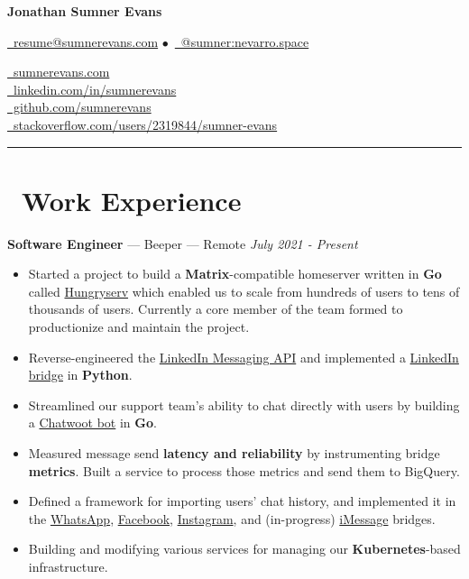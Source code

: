 \documentclass[10pt,letterpaper]{article}
\begin{document}
\begin{minipage}[b][][b]{0.5\linewidth}
    {\huge\textbf{Jonathan Sumner Evans}}

    \vspace{5pt}
    \href{mailto:resume@sumnerevans.com}{\faEnvelope\ resume@sumnerevans.com}
    $\bullet$\ \href{https://matrix.to/#/@sumner:nevarro.space}{\faMatrixOrg\ @sumner:nevarro.space}
\end{minipage}\hfill
\begin{minipage}[b][][b]{0.4375\linewidth}
    \href{https://sumnerevans.com}{\faGlobe\ sumnerevans.com} \\
    \href{https://www.linkedin.com/in/sumnerevans}{\faLinkedin\ linkedin.com/in/sumnerevans} \\
    \href{https://github.com/sumnerevans}{\faGithub\ github.com/sumnerevans} \\
    \href{https://stackoverflow.com/users/2319844/sumner-evans}{\faStackOverflow\ stackoverflow.com/users/2319844/sumner-evans}
\end{minipage}
\rule{\textwidth}{0.5pt}

\section*{\faBriefcase\ Work Experience}
{\fontsize{11}{0}
\textbf{Software Engineer} --- Beeper --- Remote}
\hfill \textit{July 2021 - Present}
\begin{itemize}
    \item Started a project to build a \textbf{Matrix}-compatible homeserver
        written in \textbf{Go} called
        \href{https://github.com/sumnerevans/hungryserv-presentation}{Hungryserv}
        which enabled us to scale from hundreds of users to tens of thousands of
        users. Currently a core member of the team formed to productionize and
        maintain the project.
    \item Reverse-engineered the
        \href{https://github.com/beeper/linkedin-messaging-api}{LinkedIn Messaging API}
        and implemented a
        \href{https://github.com/beeper/linkedin}{LinkedIn bridge} in
        \textbf{Python}.
    \item Streamlined our support team's ability to chat directly with users by
        building a
        \href{https://github.com/beeper/chatwoot}{Chatwoot bot} in
        \textbf{Go}.
    \item Measured message send \textbf{latency and reliability} by
        instrumenting bridge \textbf{metrics}. Built a service to process those
        metrics and send them to BigQuery.
    \item Defined a framework for importing users' chat history, and
        implemented it in the
        \href{https://github.com/mautrix/whatsapp}{WhatsApp},
        \href{https://github.com/mautrix/facebook}{Facebook},
        \href{https://github.com/mautrix/instagram}{Instagram}, and
        (in-progress) \href{https://github.com/mautrix/imessage}{iMessage} bridges.
    \item Building and modifying various services for managing our
        \textbf{Kubernetes}-based infrastructure.
\end{itemize}
\end{document}
